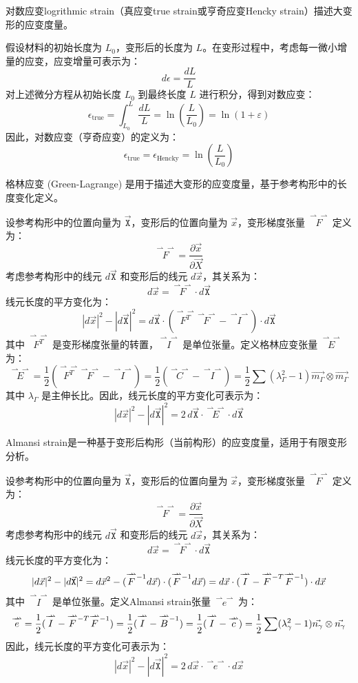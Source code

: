 \documentclass[12pt, a4paper, oneside, UTF8]{ctexbook}  %
\newcommand{\vvec}{\overset{\rightharpoonup\!\!\!\! \rightharpoonup}}
\newcommand{\X}{\mathtt{X}}
\newcommand{\lmT}{\raisebox{-0.85ex}{$\scriptstyle -T$}} %
\newcommand{\lmone}{\raisebox{-0.85ex}{$\scriptstyle -1$}} %
\begin{document}
\begin{defn}
	对数应变logrithmic strain（真应变true strain或亨奇应变Hencky strain）描述大变形的应变度量。

假设材料的初始长度为 \( L_0 \)，变形后的长度为 \( L \)。在变形过程中，考虑每一微小增量的应变，应变增量可表示为：
\[
d\epsilon = \frac{dL}{L}
\]
对上述微分方程从初始长度 \( L_0 \) 到最终长度 \( L \) 进行积分，得到对数应变：
\[
\epsilon_{\text{true}} = \int_{L_0}^{L} \frac{dL}{L} = \ln\left(\frac{L}{L_0}\right)
=\ln(1+\varepsilon)
\]
因此，对数应变（亨奇应变）的定义为：
\[
\epsilon_{\text{true}} = \epsilon_{\text{Hencky}} = \ln\left(\frac{L}{L_0}\right)
\]
\end{defn}
\begin{defn}
	格林应变 (Green-Lagrange) 是用于描述大变形的应变度量，基于参考构形中的长度变化定义。
	
	设参考构形中的位置向量为 \(\vec{\X}\)，变形后的位置向量为 \(\vec{x}\)，变形梯度张量 \(\vvec{F}\) 定义为：
\[
\vvec{F} = \frac{\partial \vec{x}}{\partial \vec{X}}
\]
考虑参考构形中的线元 \(d\vec{\X}\) 和变形后的线元 \(d\vec{x}\)，其关系为：
\[
d\vec{x} = \vvec{F} \cdot d\vec{\X}
\]
线元长度的平方变化为：
\[
|d\vec{x}|^2 - |d\vec{\X}|^2 = d\vec{\X} \cdot (\vvec{F^T} \vvec{F} - \vvec{I}) \cdot d\vec{\X}
\]
其中 \(\vvec{F^T}\) 是变形梯度张量的转置，\(\vvec{I}\) 是单位张量。定义格林应变张量 \(\vvec{E}\) 为：
\[
\vvec{E} = \frac{1}{2} (\vvec{F^T} \vvec{F} - \vvec{I})=
\frac{1}{2}(\vvec{C}-\vvec{I})=\frac{1}{2}\sum(\lambda_\Gamma^2-1)\vec{m_\Gamma}\otimes\vec{m_\Gamma}
\]
其中 \(\lambda_\Gamma\) 是主伸长比。因此，线元长度的平方变化可表示为：
\[
|d\vec{x}|^2 - |d\vec{\X}|^2 = 2 \, d\vec{\X} \cdot \vvec{E} \cdot d\vec{\X}
\]
\end{defn}
\begin{defn}
	Almansi strain是一种基于变形后构形（当前构形）的应变度量，适用于有限变形分析。

	设参考构形中的位置向量为 \(\vec{\X}\)，变形后的位置向量为 \(\vec{x}\)，变形梯度张量 \(\vvec{F}\) 定义为：
\[
\vvec{F} = \frac{\partial \vec{x}}{\partial \vec{X}}
\]
考虑参考构形中的线元 \(d\vec{\X}\) 和变形后的线元 \(d\vec{x}\)，其关系为：
\[
d\vec{x} = \vvec{F} \cdot d\vec{\X}
\]
线元长度的平方变化为：
\[
|d\vec{x}|^2 - |d\vec{\X}|^2 = d\vec{x}^2-(\vvec{F}^{\lmone}d\vec{x})\cdot(\vvec{F}^{\lmone}d\vec{x})
=d\vec{x}\cdot(\vvec{I}-\vvec{F}^{\lmT}\vvec{F}^{\lmone})\cdot d\vec{x}
\]
其中 \(\vvec{I}\) 是单位张量。定义Almansi strain张量 \(\vvec{e}\) 为：
\[
	\vvec{e}=\frac{1}{2} (\vvec{I}-\vvec{F}^{\lmT}\vvec{F}^{\lmone})
	= \frac{1}{2} (\vvec{I}-\vvec{B}^{\lmone})
	= \frac{1}{2} (\vvec{I}-\vvec{c})
	=\frac{1}{2}\sum(\lambda_\gamma^2-1)\vec{n_\gamma}\otimes\vec{n_\gamma}
\]
因此，线元长度的平方变化可表示为：
\[
|d\vec{x}|^2 - |d\vec{\X}|^2 = 2 \, d\vec{x} \cdot \vvec{e} \cdot d\vec{x}
\]
\end{defn}
\end{document}
